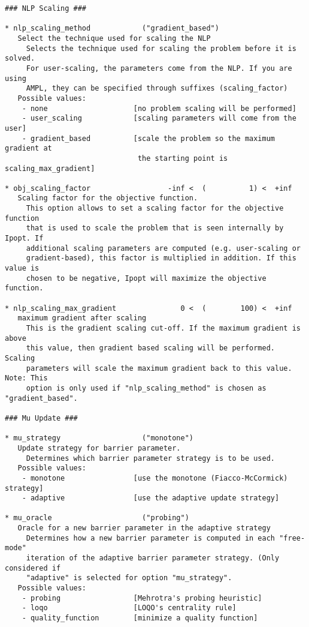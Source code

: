 \documentclass[letter,10pt]{article}
\begin{document}
{\begin{verbatim}
### NLP Scaling ###

* nlp_scaling_method            ("gradient_based")
   Select the technique used for scaling the NLP
     Selects the technique used for scaling the problem before it is solved.
     For user-scaling, the parameters come from the NLP. If you are using
     AMPL, they can be specified through suffixes (scaling_factor)
   Possible values:
    - none                    [no problem scaling will be performed]
    - user_scaling            [scaling parameters will come from the user]
    - gradient_based          [scale the problem so the maximum gradient at
                               the starting point is scaling_max_gradient]

* obj_scaling_factor                  -inf <  (          1) <  +inf      
   Scaling factor for the objective function.
     This option allows to set a scaling factor for the objective function
     that is used to scale the problem that is seen internally by Ipopt. If
     additional scaling parameters are computed (e.g. user-scaling or
     gradient-based), this factor is multiplied in addition. If this value is
     chosen to be negative, Ipopt will maximize the objective function.

* nlp_scaling_max_gradient               0 <  (        100) <  +inf      
   maximum gradient after scaling
     This is the gradient scaling cut-off. If the maximum gradient is above
     this value, then gradient based scaling will be performed. Scaling
     parameters will scale the maximum gradient back to this value. Note: This
     option is only used if "nlp_scaling_method" is chosen as "gradient_based".

### Mu Update ###

* mu_strategy                   ("monotone")
   Update strategy for barrier parameter.
     Determines which barrier parameter strategy is to be used.
   Possible values:
    - monotone                [use the monotone (Fiacco-McCormick) strategy]
    - adaptive                [use the adaptive update strategy]

* mu_oracle                     ("probing")
   Oracle for a new barrier parameter in the adaptive strategy
     Determines how a new barrier parameter is computed in each "free-mode"
     iteration of the adaptive barrier parameter strategy. (Only considered if
     "adaptive" is selected for option "mu_strategy".
   Possible values:
    - probing                 [Mehrotra's probing heuristic]
    - loqo                    [LOQO's centrality rule]
    - quality_function        [minimize a quality function]


\end{verbatim}}
\end{document}
